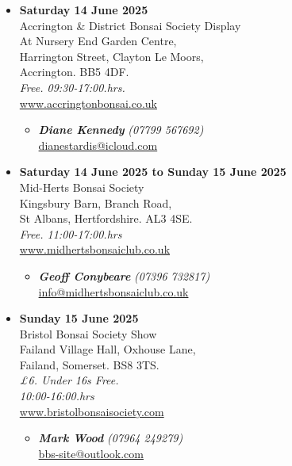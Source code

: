 \begin{itemize}
    \item \textbf{Saturday 14 June 2025}
    \\
    Accrington \& District Bonsai Society Display \\
    At Nursery End Garden Centre, \\
    Harrington Street, Clayton Le Moors, \\
    Accrington. BB5 4DF.
    \\
    \emph{Free. 09:30-17:00.hrs.}
    \\
    \href{https://www.accringtonbonsai.co.uk}{www.accringtonbonsai.co.uk}
    \begin{itemize}
        \item \textbf{\emph{Diane Kennedy}} \emph{(07799 567692)} \\
        \href{mailto:dianestardis@icloud.com}{dianestardis@icloud.com} 
    \end{itemize}

    \item \textbf{Saturday 14 June 2025 to Sunday 15 June 2025}
    \\
    Mid-Herts Bonsai Society \\
    Kingsbury Barn, Branch Road, \\
    St Albans, Hertfordshire. AL3 4SE.
    \\
    \emph{Free. 11:00-17:00.hrs}
    \\
    \href{https://www.midhertsbonsaiclub.co.uk}{www.midhertsbonsaiclub.co.uk}
    \begin{itemize}
        \item \textbf{\emph{Geoff Conybeare}} \emph{(07396 732817)} \\
        \href{mailto:info@midhertsbonsaiclub.co.uk}{info@midhertsbonsaiclub.co.uk} 
    \end{itemize}

    \item \textbf{Sunday 15 June 2025}
    \\
    Bristol Bonsai Society Show \\
    Failand Village Hall, Oxhouse Lane, \\
    Failand, Somerset. BS8 3TS.
    \\
    \emph{£6. Under 16s Free.} \\
    \emph{10:00-16:00.hrs}
    \\
    \href{http://www.bristolbonsaisociety.com/}{www.bristolbonsaisociety.com}
    \begin{itemize}
        \item \textbf{\emph{Mark Wood}} \emph{(07964 249279)} \\
        \href{mailto:bbs-site@outlook.com}{bbs-site@outlook.com} 
    \end{itemize}


\end{itemize}

